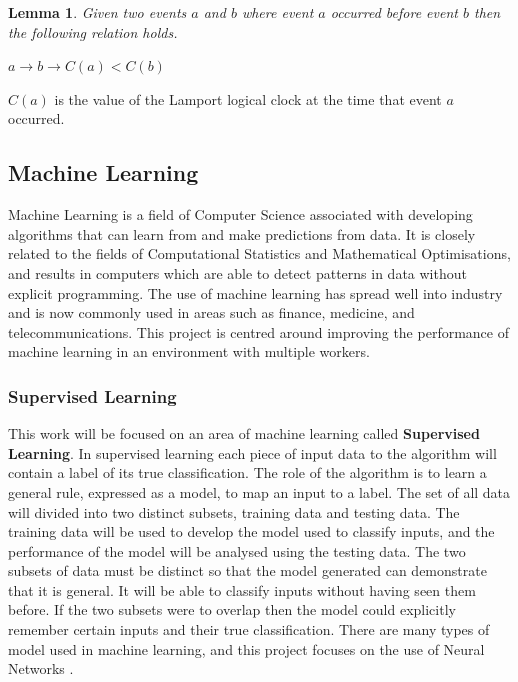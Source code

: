 \documentclass[12pt]{article}
\newtheorem{lemma}{Lemma}
\begin{document}
\begin{lemma}
Given two events $a$ and $b$ where event $a$ occurred before event $b$ then the following relation holds.

$a \rightarrow b \longrightarrow C(a) < C(b)$
\label{LogicalOrderingLemma}
\end{lemma}
$C(a)$ is the value of the Lamport logical clock at the time that event $a$ occurred.

\subsection{Machine Learning}
Machine Learning is a field of Computer Science associated with developing algorithms that can learn from and make predictions from data\cite{machineLearningDef}. It is closely related to the fields of Computational Statistics and Mathematical Optimisations, and results in computers which are able to detect patterns in data without explicit programming. The use of machine learning has spread well into industry and is now commonly used in areas such as finance, medicine, and telecommunications. This project is centred around improving the performance of machine learning in an environment with multiple workers.

\subsubsection{Supervised Learning} \label{supervised}
This work will be focused on an area of machine learning called \textbf{Supervised Learning}. In supervised learning each piece of input data to the algorithm will contain a label of its true classification. The role of the algorithm is to learn a general rule, expressed as a model, to map an input to a label. The set of all data will divided into two distinct subsets, training data and testing data. The training data will be used to develop the model used to classify inputs, and the performance of the model will be analysed using the testing data. The two subsets of data must be distinct so that the model generated can demonstrate that it is general. It will be able to classify inputs without having seen them before. If the two subsets were to overlap then the model could explicitly remember certain inputs and their true classification.
\newline
\newline
There are many types of model used in machine learning, and this project focuses on the use of Neural Networks \cite{mackay2003information}.
\end{document}
